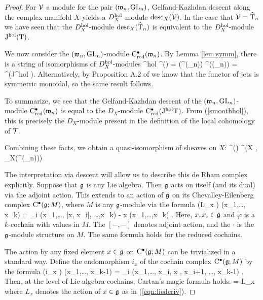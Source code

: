 \documentclass[11pt]{amsart}
\begin{document}
\begin{proof}
For $\mathcal V$ a module for the pair $(\mathfrak w_n, {\rm GL}_n)$, Gelfand-Kazhdan descent along the complex manifold $X$ yields a $D^{\rm hol}_X$-module ${\rm desc}_X(\mathcal V)$. 
In the case that $\mathcal V = \widehat{{\rm T}}_n$ we have seen that the $D^{\rm hol}_X$-module ${\rm desc}_X(\widehat{{\rm T}}_n)$ is equivalent to the $D^{\rm hol}_X$-module ${\rm J}^{\rm hol} ({\rm T})$. 

We now consider the $(\mathfrak w_n, {\rm GL}_n)$-module ${\rm C}_{\rm red}^\bullet(\mathfrak w_n)$. 
By Lemma \ref{lem:symm}, there is a string of isomorphisms of $D^{\rm hol}_X$-modules
\beqn
\jet^{\rm hol} \cred^\bu (\tangent) = \desc(\cred^\bu(\fw_n)) \cong \cred^\bu(\desc(\fw_n)) = \cred^\bu({\rm J}^{\rm hol} \tangent).
\eeqn
Alternatively, by Proposition A.2 of \cite{GG3} we know that the functor of jets is symmetric monoidal, so the same result follows.

To summarize, we see that the Gelfand-Kazhdan descent of the $(\mathfrak w_n, {\rm GL}_n)$-module ${\rm C}_{\rm red}^\bullet(\mathfrak w_n)$ is equal to the $D_X$-module ${\rm C}_{\rm red}^\bullet({\rm J}^{\rm hol} {\rm T})$.
From (\ref{smoothhol}), this is precisely the $D_X$-module present in the definition of the local cohomology of $\mathcal T$.

Combining these facts, we obtain a quasi-isomorphism of sheaves on $X$:
\beqn
\cloc^\bu(\cT) \; \simeq \; \Omega^\bu\bigg(X , \desc_X\left(\cred^\bu(\fw_n)\right)\bigg)
\eeqn

The interpretation via descent will allow us to describe this de Rham complex explicitly. 
Suppose that $\mathfrak g$ is any Lie algebra.
Then $\mathfrak g$ acts on itself (and its dual) via the adjoint action. 
This extends to an action of $\mathfrak g$ on its Chevalley-Eilenberg complex ${\rm C}^\bullet(\mathfrak g ; M)$, where $M$ is any $\mathfrak g$-module via the formula
\beqn\label{eqn:liederiv}
(L_x \varphi) (x_1,\ldots, x_k) = \sum_i \varphi(x_1,\ldots, [x, x_i], \ldots,x_k) - x \cdot \varphi(x_1,\ldots,x_k) .
\eeqn
Here, $x, x_i \in \mathfrak g$ and $\varphi$ is a $k$-cochain with values in $M$.
The $[-,-]$ denotes adjoint action, and the $\cdot$ is the $\mathfrak g$-module structure on $M$. 
The same formula holds for the reduced cochains.

The action by any fixed element $x\in \mathfrak g$ on ${\rm C}^\bullet(\mathfrak g ; M)$ can be trivialized in a standard way. 
Define the endomorphism $i_x$ of the cochain complex ${\rm C}^\bullet(\mathfrak g ; M)$ by the formula
\beqn
(i_x \varphi) (x_1,\ldots, x_{k-1}) = \sum_i \varphi (x_1,\ldots, x_i, x , x_{i+1}, \ldots, x_{k-1}) .
\eeqn
Then, at the level of Lie algebra cochains, Cartan's magic formula holds:
\beqn
[\d_{\rm CE}, i_x] = L_x
\eeqn
where $L_x$ denotes the action of $x \in \mathfrak g$ as in (\ref{eqn:liederiv}). 


\end{proof}
\end{document}
